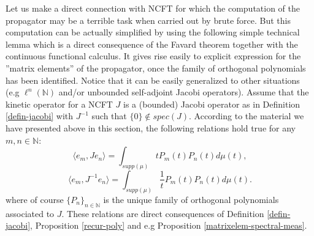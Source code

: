 \documentclass[a4paper,11pt,twoside]{article}
\numberwithin{equation}{section}
\theoremstyle{nonumberplain}
\begin{document}
Let us make a direct connection with NCFT for which the computation of the propagator may be a terrible task when carried out by brute force. But this computation can be actually simplified by using the following simple technical lemma which is a direct consequence of the Favard theorem together with the continuous functional calculus. It gives rise easily to explicit expression for the ''matrix elements'' of the propagator, once the family of orthogonal polynomials has been identified. Notice that it can be easily generalized to other situations (e.g $\ell^n(\mathbb{N})$ and/or unbounded self-adjoint Jacobi operators). Assume that the kinetic operator for a NCFT $J$ is a (bounded) Jacobi operator as in Definition \ref{defin-jacobi} with $J^{-1}$ such that $\{0\}\notin spec(J)$. According to the material we have presented above in this section, the following relations hold true for any $m,n\in\mathbb{N}$:
\begin{equation}
\langle e_m,J e_n \rangle=\int_{supp(\mu)}tP_m(t)P_n(t)d\mu(t),\label{formal-kinetic-operatoren}
\end{equation}
\begin{equation}
 \langle e_m,J^{-1} e_n\rangle=\int_{supp(\mu)}\frac{1}{t}P_m(t)P_n(t)d\mu(t)\label{formal-propagatoren}.
\end{equation}
where of course $\{P_n\}_{n\in\mathbb{N}}$ is the unique family of orthogonal polynomials associated to $J$. These relations are direct consequences of Definition \ref{defin-jacobi}, Proposition \ref{recur-poly} and e.g Proposition \ref{matrixelem-spectral-meas}. \par
\end{document}
